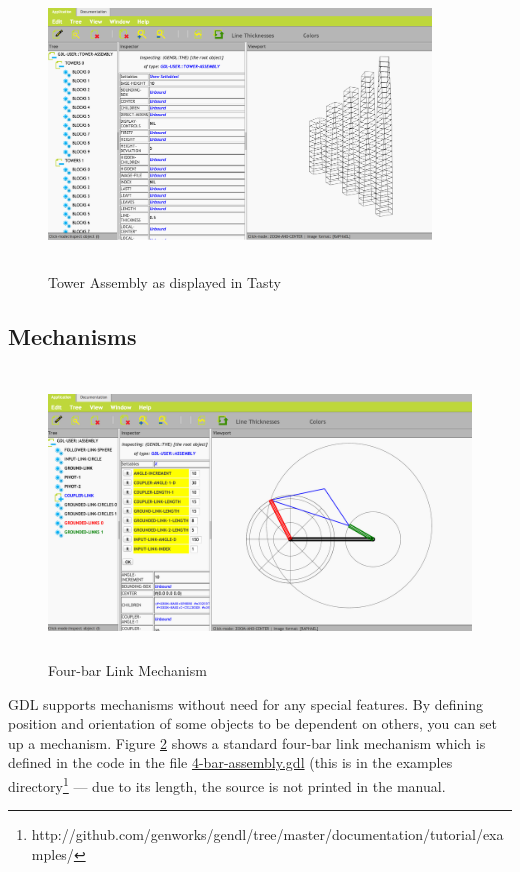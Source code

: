 \documentclass [11pt]{book}
\begin{document}
\begin{figure}
\begin{center}
\includegraphics[width=4in,height=3in]{../images/tower-assembly-tasty.png}
\end{center}

\caption{Tower Assembly as displayed in Tasty}

\label{fig:tasty-assembly-tasty}

\end{figure}


\subsection{Mechanisms}

\label{subsec:mechanisms}


\begin{figure}
\begin{center}
\includegraphics[width=5in,height=3in]{../images/4-bar-image.png}
\end{center}

\caption{Four-bar Link Mechanism}

\label{fig:4bar-image}

\end{figure}
GDL supports mechanisms without need for any special
features. By defining position and orientation of some objects to be
dependent on others, you can set up a mechanism. Figure 
\ref{fig:4bar-image} shows a standard four-bar link mechanism which is defined in the code in 
the file \href{run:../examples/4-bar-assembly.gdl}{4-bar-assembly.gdl} (this is in the examples directory\footnote{http://github.com/genworks/gendl/tree/master/documentation/tutorial/examples/} --- due to its length, the
     source is not printed in the manual.
\end{document}
